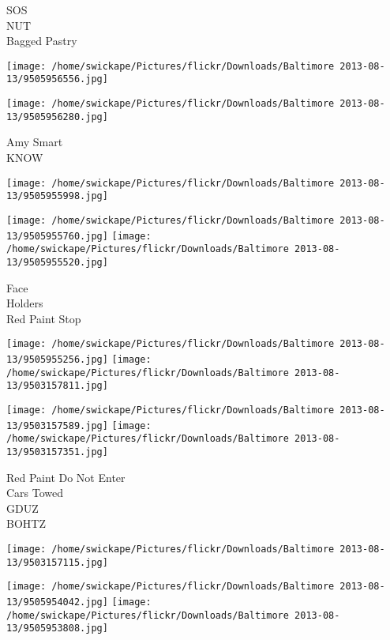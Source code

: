 \documentclass[10pt,letterpaper]{article}
\begin{document}
SOS\\
NUT\\
Bagged Pastry\\
\pagebreak

\texttt{[image: /home/swickape/Pictures/flickr/Downloads/Baltimore 2013-08-13/9505956556.jpg]}

\vspace{0.25in}
\texttt{[image: /home/swickape/Pictures/flickr/Downloads/Baltimore 2013-08-13/9505956280.jpg]}

Amy Smart\\
KNOW\\
\pagebreak

\texttt{[image: /home/swickape/Pictures/flickr/Downloads/Baltimore 2013-08-13/9505955998.jpg]}

\vspace{0.25in}
\texttt{[image: /home/swickape/Pictures/flickr/Downloads/Baltimore 2013-08-13/9505955760.jpg]}
\texttt{[image: /home/swickape/Pictures/flickr/Downloads/Baltimore 2013-08-13/9505955520.jpg]}

Face\\
Holders\\
Red Paint Stop\\
\pagebreak

\texttt{[image: /home/swickape/Pictures/flickr/Downloads/Baltimore 2013-08-13/9505955256.jpg]}
\texttt{[image: /home/swickape/Pictures/flickr/Downloads/Baltimore 2013-08-13/9503157811.jpg]}

\texttt{[image: /home/swickape/Pictures/flickr/Downloads/Baltimore 2013-08-13/9503157589.jpg]}
\texttt{[image: /home/swickape/Pictures/flickr/Downloads/Baltimore 2013-08-13/9503157351.jpg]}

Red Paint Do Not Enter\\
Cars Towed\\
GDUZ\\
BOHTZ\\
\pagebreak

\texttt{[image: /home/swickape/Pictures/flickr/Downloads/Baltimore 2013-08-13/9503157115.jpg]}

\vspace{0.25in}
\texttt{[image: /home/swickape/Pictures/flickr/Downloads/Baltimore 2013-08-13/9505954042.jpg]}
\texttt{[image: /home/swickape/Pictures/flickr/Downloads/Baltimore 2013-08-13/9505953808.jpg]}
\end{document}
